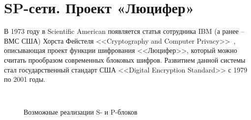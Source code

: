 \section{SP-сети. Проект «Люцифер»}\label{project-lucifer}

В 1973 году  в Scientific American появляется статья сотрудника IBM (а ранее -- ВМС США) Хорста Фейстеля <<Cryptography and Computer Privacy>>~\cite{Feistel:1973}, описывающая проект функции шифрования <<Люцифер>>, который можно считать прообразом современных блоковых шифров. Развитием данной системы стал государственный стандарт США <<Digital Encryption Standard>> с 1979 по 2001 годы.

\begin{figure}[!t]
    \centering
    ~~~
		\caption{Возможные реализации S- и P-блоков}
\end{figure}

